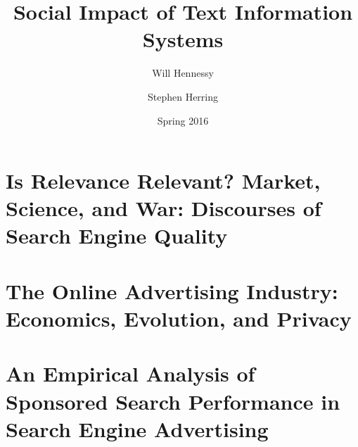 \documentclass[11pt]{article}
\title{Social Impact of Text Information Systems}
\author{Will Hennessy \and Stephen Herring}
\date{Spring 2016}
\begin{document}
\maketitle


\newpage

%

\section{Is Relevance Relevant? Market, Science, and War:  Discourses of Search Engine Quality}

\newpage

%

\section{The Online Advertising Industry: Economics, Evolution, and Privacy}

\newpage

%

%

%

\section{An Empirical Analysis of Sponsored Search Performance in Search Engine Advertising}

\newpage

%

%
\end{document}
